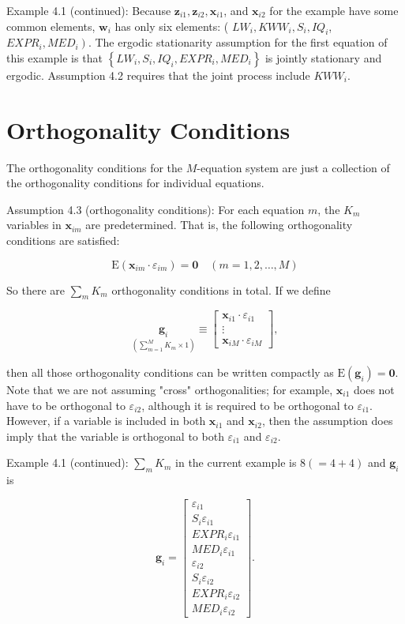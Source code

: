 \documentclass[10pt]{article}
\begin{document}
Example 4.1 (continued): Because $\mathbf{z}_{i 1}, \mathbf{z}_{i 2}, \mathbf{x}_{i 1}$, and $\mathbf{x}_{i 2}$ for the example have some common elements, $\mathbf{w}_{i}$ has only six elements: ( $L W_{i}, K W W_{i}, S_{i}, I Q_{i}$, $\left.E X P R_{i}, M E D_{i}\right)$. The ergodic stationarity assumption for the first equation of this example is that $\left\{L W_{i}, S_{i}, I Q_{i}, E X P R_{i}, M E D_{i}\right\}$ is jointly stationary and ergodic. Assumption 4.2 requires that the joint process include $K W W_{i}$.

\section*{Orthogonality Conditions}
The orthogonality conditions for the $M$-equation system are just a collection of the orthogonality conditions for individual equations.

Assumption 4.3 (orthogonality conditions): For each equation $m$, the $K_{m}$ variables in $\mathbf{x}_{i m}$ are predetermined. That is, the following orthogonality conditions are satisfied:

$$
\mathrm{E}\left(\mathbf{x}_{i m} \cdot \varepsilon_{i m}\right)=\mathbf{0} \quad(m=1,2, \ldots, M)
$$

So there are $\sum_{m} K_{m}$ orthogonality conditions in total. If we define

\[
\underset{\left(\sum_{m=1}^{M} K_{m} \times 1\right)}{\mathbf{g}_{i}} \equiv\left[\begin{array}{c}
\mathbf{x}_{i 1} \cdot \varepsilon_{i 1}  \tag{4.1.4}\\
\vdots \\
\mathbf{x}_{i M} \cdot \varepsilon_{i M}
\end{array}\right],
\]

then all those orthogonality conditions can be written compactly as $\mathrm{E}\left(\mathbf{g}_{i}\right)=\mathbf{0}$. Note that we are not assuming "cross" orthogonalities; for example, $\mathbf{x}_{i 1}$ does not have to be orthogonal to $\varepsilon_{i 2}$, although it is required to be orthogonal to $\varepsilon_{i 1}$. However, if a variable is included in both $\mathbf{x}_{i 1}$ and $\mathbf{x}_{i 2}$, then the assumption does imply that the variable is orthogonal to both $\varepsilon_{i 1}$ and $\varepsilon_{i 2}$.

Example 4.1 (continued): $\sum_{m} K_{m}$ in the current example is $8(=4+4)$ and $\mathbf{g}_{i}$ is

$$
\mathbf{g}_{i}=\left[\begin{array}{c}
\varepsilon_{i 1} \\
S_{i} \varepsilon_{i 1} \\
E X P R_{i} \varepsilon_{i 1} \\
M E D_{i} \varepsilon_{i 1} \\
\varepsilon_{i 2} \\
S_{i} \varepsilon_{i 2} \\
E X P R_{i} \varepsilon_{i 2} \\
M E D_{i} \varepsilon_{i 2}
\end{array}\right] .
$$
\end{document}
